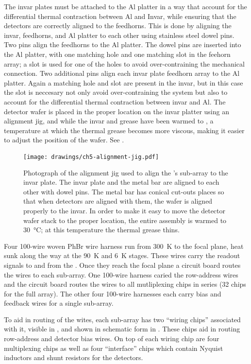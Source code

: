 The invar plates must be attached to the Al platter in a way that account for the differential thermal contraction between Al and Invar, while ensuring that the detectors are correctly aligned to the feedhorns.
This is done by aligning the invar, feedhorns, and Al platter to each other using stainless steel dowel pins.
Two pins align the feedhorns to the Al platter.
The dowel pins are inserted into the Al platter, with one matching hole and one matching slot in the feehorn array; a slot is used for one of the holes to avoid over-contraining the mechanical connection.
Two additional pins align each invar plate feedhorn array to the Al platter.
Again a matching hole and slot are present in the invar, but in this case the slot is neccesary not only avoid over-contraining the system but also to account for the differential thermal contraction between invar and Al.
The detector wafer is placed in the proper location on the invar platter using an alignment jig, and while the invar and grease have been warmed to , a temperature at which the thermal grease becomes more viscous, making it easier to adjust the position of the wafer.
See .

\begin{figure}
\centering
\texttt{[image: drawings/ch5-alignment-jig.pdf]}
\caption{
  Photograph of the alignment jig used to align the \Imager's sub-array to the invar plate.
  The invar plate and the metal bar are aligned to each other with dowel pins.
  The metal bar has conical cut-outs places so that when detectors are aligned with them, the wafer is aligned properly to the invar.
  In order to make it easy to move the detector wafer stack to the proper location, the entire assembly is warmed to \SI{30}{\celsius}; at this temperature the thermal grease thins.
}
\label{fig:ch5-alignment-jig}
\end{figure}

Four 100-wire woven PhBr wire harness run from \SI{300}{\K} to the focal plane, heat sunk along the way at the \SI{90}{\K} and \SI{6}{\K} stages.
These wires carry the readout signals to and from the \MCE.
Once they reach the focal plane a circuit board routes the wires to each sub-array.
One 100-wire harness caried the row-address wires and the circuit board routes the wires to all mutliplexing chips in series (32 chips for the full array).
The other four 100-wire harnesses each carry \SQUID bias and feedback wires for a single sub-array.

To aid in routing of the wites, each sub-array has two ``wiring chips'' associated with it, visible in , and shown in schematic form in .
These chips aid in routing row-address and detector bias wires.
On top of each wiring chip are four multiplexing chips as well as four ``interface'' chips which contain Nyquist inductors and shunt resistors for the detectors.

